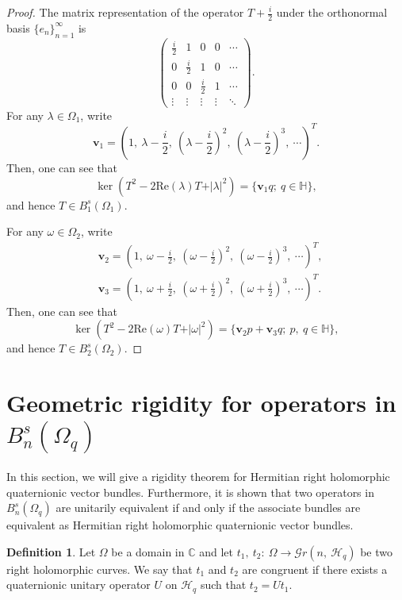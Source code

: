 \documentclass[pdflatex,sn-mathphys-num]{sn-jnl}%
\theoremstyle{thmstyleone}%
\theoremstyle{thmstyletwo}%
\theoremstyle{thmstylethree}%
\newtheorem{definition}{Definition}%
\theoremstyle{definition}
\newtheorem{definition}[theorem]{Definition}
\theoremstyle{remark}
\begin{document}
		\begin{proof}
		The matrix representation of the operator $T+\frac{i}{2}$ under the orthonormal basis  $\{e_n\}_{n=1}^{\infty}$ is
    $$
    \begin{pmatrix}
    \frac{i}{2} & 1 & 0 & 0 & \cdots \\
    0 & \frac{i}{2} & 1 & 0 & \cdots \\
    0 & 0 & \frac{i}{2} & 1 & \cdots \\
    \vdots & \vdots & \vdots & \vdots & \ddots
    \end{pmatrix}.
$$
     For any $\lambda\in\Omega_1$, write
    $$
    \boldsymbol{v}_1=\left(1,\ \lambda-\frac{i}{2},\ \left(\lambda-\frac{i}{2}\right)^2,\ \left(\lambda-\frac{i}{2}\right)^3,\ \cdots\right)^T.
    $$
   Then, one can see that
   \[
   \ker(T^2-2\mathrm{Re}(\lambda) T+\vert \lambda \vert^2)=\{\boldsymbol{v}_1q;\ q\in\mathbb{H}\},
   \]
 and hence $T\in B_1^{s}(\Omega_1)$.

     For any $\omega\in\Omega_2$, write
     \begin{align*}
    &\boldsymbol{v}_2=\left(1,\ \omega-\frac{i}{2},\ \left(\omega-\frac{i}{2}\right)^2,\ \left(\omega-\frac{i}{2}\right)^3,\ \cdots\right)^T, \\
    &\boldsymbol{v}_3=\left(1,\ \omega+\frac{i}{2},\ \left(\omega+\frac{i}{2}\right)^2,\ \left(\omega+\frac{i}{2}\right)^3,\ \cdots\right)^T.
    \end{align*}
Then, one can see that
\[
\ker(T^2-2\mathrm{Re}(\omega) T+\vert \omega \vert^2)=\{\boldsymbol{v}_2p+\boldsymbol{v}_3q;\ p,\ q\in\mathbb{H}\},
\]
and hence  $T\in B_2^{s}(\Omega_2)$.
		\end{proof}	
		
		
		
		\section{Geometric rigidity for operators in $B_n^{s}(\Omega_q)$}
In this section, we will give a rigidity theorem for Hermitian right holomorphic quaternionic vector bundles. Furthermore, it is shown that two operators in $B_n^{s}(\Omega_q)$ are unitarily equivalent if and only if the associate bundles are equivalent as Hermitian right holomorphic quaternionic vector bundles.

\begin{definition}\label{CG}
	Let $\Omega$ be a domain in $\mathbb{C}$ and let $t_1,\ t_2:\ \Omega\rightarrow\mathcal{G}r(n,\ \mathcal{H}_q)$ be two right holomorphic curves. We
	say that $t_1$ and $t_2$ are congruent if there exists a quaternionic unitary operator $U$ on $\mathcal{H}_q$ such that $t_2=Ut_1$.
\end{definition}
\end{document}
